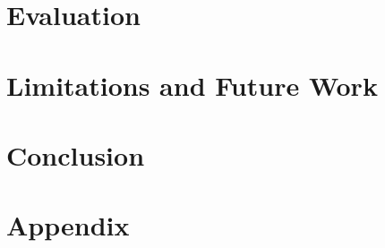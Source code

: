 \documentclass{jdf}
\begin{document}
\section{Evaluation}

\section{Limitations and Future Work}

\section{Conclusion}

\section{Appendix}



\end{document}
